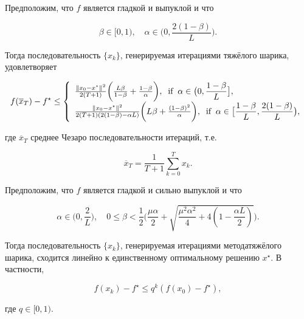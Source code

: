 \documentclass[
  russian,
  letterpaper,
  DIV=11,
  numbers=noendperiod]{scrartcl}
\begin{document}
\begin{tcolorbox}[enhanced jigsaw, colbacktitle=quarto-callout-color!10!white, opacitybacktitle=0.6, arc=.35mm, toptitle=1mm, rightrule=.15mm, opacityback=0, titlerule=0mm, breakable, title=\textcolor{quarto-callout-color}{\faInfo}\hspace{0.5em}{Theorem}, colframe=quarto-callout-color-frame, coltitle=black, bottomtitle=1mm, left=2mm, toprule=.15mm, bottomrule=.15mm, colback=white, leftrule=.75mm]

Предположим, что \(f\) является гладкой и выпуклой и что

\[
\beta\in[0,1),\quad \alpha\in\biggl(0,\dfrac{2(1-\beta)}{L}\biggr).
\]

Тогда последовательность \(\{x_k\}\), генерируемая итерациями тяжёлого
шарика, удовлетворяет

\[
f(\overline{x}_T)-f^{\star} \leq  \left\{
\begin{array}[l]{ll}
\frac{\Vert x_{0}-x^\star\Vert^2}{2(T+1)}\biggl(\frac{L\beta}{1-\beta}+\frac{1-\beta}{\alpha}\biggr),\;\;\textup{if}\;\;
\alpha\in\bigl(0,\dfrac{1-\beta}{L}\bigr],\\
\frac{\Vert x_{0}-x^\star\Vert^2}{2(T+1)(2(1-\beta)-\alpha L)}\biggl({L\beta}+\frac{(1-\beta)^2}{\alpha}\biggr),\;\;\textup{if}\;\;
\alpha\in\bigl[\dfrac{1-\beta}{L},\dfrac{2(1-\beta)}{L}\bigr),
\end{array}
\right.
\]

где \(\overline{x}_T\) среднее Чезаро последовательности итераций, т.е.

\[
\overline{x}_T = \frac{1}{T+1}\sum_{k=0}^T x_k.
\]

\end{tcolorbox}

\begin{tcolorbox}[enhanced jigsaw, colbacktitle=quarto-callout-color!10!white, opacitybacktitle=0.6, arc=.35mm, toptitle=1mm, rightrule=.15mm, opacityback=0, titlerule=0mm, breakable, title=\textcolor{quarto-callout-color}{\faInfo}\hspace{0.5em}{Theorem}, colframe=quarto-callout-color-frame, coltitle=black, bottomtitle=1mm, left=2mm, toprule=.15mm, bottomrule=.15mm, colback=white, leftrule=.75mm]

Предположим, что \(f\) является гладкой и сильно выпуклой и что

\[
\alpha\in\biggl(0,\dfrac{2}{L}\biggr),\quad 0\leq  \beta<\dfrac{1}{2}\biggl( \dfrac{\mu \alpha}{2}+\sqrt{\dfrac{\mu^2\alpha^2}{4}+4(1-\frac{\alpha L}{2})} \biggr) .
\]

Тогда последовательность \(\{x_k\}\), генерируемая итерациями
методатяжёлого шарика, сходится линейно к единственному оптимальному
решению \(x^\star\). В частности,

\[
f(x_{k})-f^\star \leq q^k (f(x_0)-f^\star),
\]

где \(q\in[0,1)\).

\end{tcolorbox}
\end{document}
